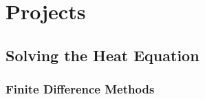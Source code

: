 \chapter{Projects}
\label{chap:Projects}

\section{Solving the Heat Equation}

\subsection{Finite Difference Methods}
